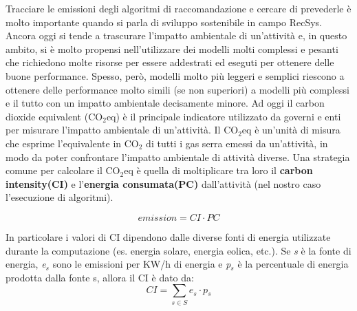\noindent
Tracciare le emissioni degli algoritmi di raccomandazione e cercare di prevederle è molto importante quando si parla di sviluppo sostenibile in campo RecSys. Ancora oggi si tende a trascurare l'impatto ambientale di un'attività e, in questo ambito, si è molto propensi nell'utilizzare dei modelli molti complessi e pesanti
che richiedono molte risorse per essere addestrati ed eseguti per ottenere delle buone performance. Spesso, però, modelli molto più leggeri e semplici riescono a ottenere delle performance molto simili (se non superiori) a modelli più complessi e il tutto con un impatto ambientale decisamente minore.
Ad oggi il carbon dioxide equivalent (CO$_2$eq) è il principale indicatore utilizzato da governi e enti per misurare l'impatto ambientale di un'attività.
Il CO$_2$eq è un'unità di misura che esprime l'equivalente in CO$_2$ di tutti i gas serra emessi da un'attività, in modo da poter confrontare l'impatto ambientale di attività diverse.
Una strategia comune per calcolare il CO$_2$eq è quella di moltiplicare tra loro il \textbf{carbon intensity(CI)} e l'\textbf{energia consumata(PC)} dall'attività (nel nostro caso l'esecuzione di algoritmi).



\begin{equation*}
    \textit{emission} = \textit{CI}  \cdot \textit{PC}
\end{equation*}

\noindent In particolare i valori di CI dipendono dalle diverse fonti di energia utilizzate durante la computazione 
(es. energia solare, energia eolica, etc.). Se \textit{s} è la fonte di energia,  \textit{e$_s$} sono le emissioni per KW/h di energia e \textit{p$_s$}  è la percentuale di energia prodotta dalla fonte s, allora il CI è dato da:
\begin{equation*}
    \textit{CI} = \sum_{s \in S} \textit{e$_s$} \cdot \textit{p$_s$}
\end{equation*}


